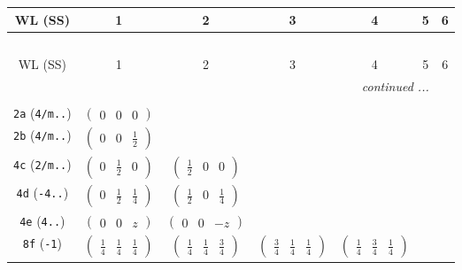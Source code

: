 \documentclass[fleqn,9pt,landscape]{jsarticle}
\begin{document}
\begin{center}
\renewcommand{\arraystretch}{1.2}
\begin{longtable}{ccccccc}
 \hline \hline
WL (SS) & 1 & 2 & 3 & 4 & 5 & 6 \\ \hline \endfirsthead

\multicolumn{6}{l}{\tablename\ \thetable{}} \\
 \hline \hline
WL (SS) & 1 & 2 & 3 & 4 & 5 & 6 \\ \hline \endhead

 \hline \hline
\multicolumn{6}{r}{\footnotesize\it continued ...} \\ \endfoot

 \hline \hline
\multicolumn{6}{r}{} \\ \endlastfoot

{\tt 2a} ({\tt 4/m..}) & $ \begin{pmatrix} 0 & 0 & 0 \end{pmatrix} $ & $  $ & $  $ & $  $ & $  $ & $  $ \\ \hline
{\tt 2b} ({\tt 4/m..}) & $ \begin{pmatrix} 0 & 0 & \frac{1}{2} \end{pmatrix} $ & $  $ & $  $ & $  $ & $  $ & $  $ \\ \hline
{\tt 4c} ({\tt 2/m..}) & $ \begin{pmatrix} 0 & \frac{1}{2} & 0 \end{pmatrix} $ & $ \begin{pmatrix} \frac{1}{2} & 0 & 0 \end{pmatrix} $ & $  $ & $  $ & $  $ & $  $ \\ \hline
{\tt 4d} ({\tt -4..}) & $ \begin{pmatrix} 0 & \frac{1}{2} & \frac{1}{4} \end{pmatrix} $ & $ \begin{pmatrix} \frac{1}{2} & 0 & \frac{1}{4} \end{pmatrix} $ & $  $ & $  $ & $  $ & $  $ \\ \hline
{\tt 4e} ({\tt 4..}) & $ \begin{pmatrix} 0 & 0 & z \end{pmatrix} $ & $ \begin{pmatrix} 0 & 0 & - z \end{pmatrix} $ & $  $ & $  $ & $  $ & $  $ \\ \hline
{\tt 8f} ({\tt -1}) & $ \begin{pmatrix} \frac{1}{4} & \frac{1}{4} & \frac{1}{4} \end{pmatrix} $ & $ \begin{pmatrix} \frac{1}{4} & \frac{1}{4} & \frac{3}{4} \end{pmatrix} $ & $ \begin{pmatrix} \frac{3}{4} & \frac{1}{4} & \frac{1}{4} \end{pmatrix} $ & $ \begin{pmatrix} \frac{1}{4} & \frac{3}{4} & \frac{1}{4} \end{pmatrix} $ & $  $ & $  $ \\ \hline

\end{longtable}
\end{center}
\end{document}
